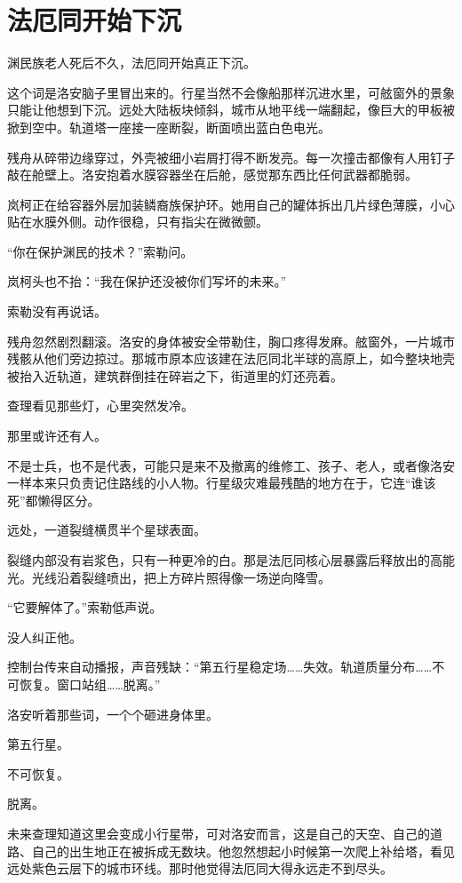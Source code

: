 \chapter{法厄同开始下沉}

渊民族老人死后不久，法厄同开始真正下沉。

这个词是洛安脑子里冒出来的。行星当然不会像船那样沉进水里，可舷窗外的景象只能让他想到下沉。远处大陆板块倾斜，城市从地平线一端翻起，像巨大的甲板被掀到空中。轨道塔一座接一座断裂，断面喷出蓝白色电光。

残舟从碎带边缘穿过，外壳被细小岩屑打得不断发亮。每一次撞击都像有人用钉子敲在舱壁上。洛安抱着水膜容器坐在后舱，感觉那东西比任何武器都脆弱。

岚柯正在给容器外层加装鳞裔族保护环。她用自己的罐体拆出几片绿色薄膜，小心贴在水膜外侧。动作很稳，只有指尖在微微颤。

“你在保护渊民的技术？”索勒问。

岚柯头也不抬：“我在保护还没被你们写坏的未来。”

索勒没有再说话。

残舟忽然剧烈翻滚。洛安的身体被安全带勒住，胸口疼得发麻。舷窗外，一片城市残骸从他们旁边掠过。那城市原本应该建在法厄同北半球的高原上，如今整块地壳被抬入近轨道，建筑群倒挂在碎岩之下，街道里的灯还亮着。

查理看见那些灯，心里突然发冷。

那里或许还有人。

不是士兵，也不是代表，可能只是来不及撤离的维修工、孩子、老人，或者像洛安一样本来只负责记住路线的小人物。行星级灾难最残酷的地方在于，它连“谁该死”都懒得区分。

远处，一道裂缝横贯半个星球表面。

裂缝内部没有岩浆色，只有一种更冷的白。那是法厄同核心层暴露后释放出的高能光。光线沿着裂缝喷出，把上方碎片照得像一场逆向降雪。

“它要解体了。”索勒低声说。

没人纠正他。

控制台传来自动播报，声音残缺：“第五行星稳定场……失效。轨道质量分布……不可恢复。窗口站组……脱离。”

洛安听着那些词，一个个砸进身体里。

第五行星。

不可恢复。

脱离。

未来查理知道这里会变成小行星带，可对洛安而言，这是自己的天空、自己的道路、自己的出生地正在被拆成无数块。他忽然想起小时候第一次爬上补给塔，看见远处紫色云层下的城市环线。那时他觉得法厄同大得永远走不到尽头。

